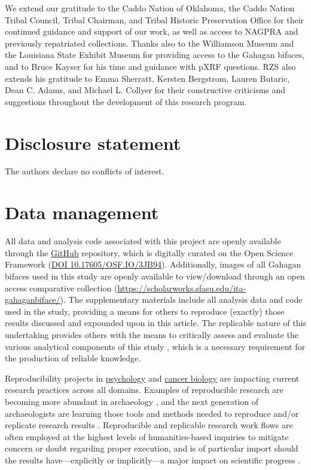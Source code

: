 \documentclass[]{interact}
\theoremstyle{plain}%
\theoremstyle{definition}
\theoremstyle{remark}
\begin{document}
We extend our gratitude to the Caddo Nation of Oklahoma, the Caddo
Nation Tribal Council, Tribal Chairman, and Tribal Historic Preservation
Office for their continued guidance and support of our work, as well as
access to NAGPRA and previously repatriated collections. Thanks also to
the Williamson Museum and the Louisiana State Exhibit Museum for
providing access to the Gahagan bifaces, and to Bruce Kayser for his
time and guidance with pXRF questions. RZS also extends his gratitude to
Emma Sherratt, Kersten Bergstrom, Lauren Butaric, Dean C. Adams, and
Michael L. Collyer for their constructive criticisms and suggestions
throughout the development of this research program.

\hypertarget{disclosure-statement}{%
\section*{Disclosure statement}\label{disclosure-statement}}

The authors declare no conflicts of interest.

\hypertarget{data-management}{%
\section*{Data management}\label{data-management}}

All data and analysis code associated with this project are openly
available through the
\href{https://github.com/seldenlab/gahaganmorph.5}{GitHub} repository,
which is digitally curated on the Open Science Framework
(\href{https://osf.io/3jb94/}{DOI 10.17605/OSF.IO/3JB94}). Additionally,
images of all Gahagan bifaces used in this study are openly available to
view/download through an open access comparative collection
(\url{https://scholarworks.sfasu.edu/ita-gahaganbiface/}). The
supplementary materials include all analysis data and code used in the
study, providing a means for others to reproduce (exactly) those results
discussed and expounded upon in this article. The replicable nature of
this undertaking provides others with the means to critically assess and
evaluate the various analytical components of this study
\citep{RN20915, RN20916, RN20917}, which is a necessary requirement for
the production of reliable knowledge.

Reproducibility projects in \href{https://osf.io/ezcuj/}{psychology} and
\href{https://www.cos.io/rpcb}{cancer biology} are impacting current
research practices across all domains. Examples of reproducible research
are becoming more abundant in archaeology
\citep{RN20804, RN21009, RN21001, RN9364, RN11097}, and the next
generation of archaeologists are learning those tools and methods needed
to reproduce and/or replicate research results \citep{RN21007}.
Reproducible and replicable research work flows are often employed at
the highest levels of humanities-based inquiries to mitigate concern or
doubt regarding proper execution, and is of particular import should the
results have---explicitly or implicitly---a major impact on scientific
progress \citep{RN21008}.
\end{document}
